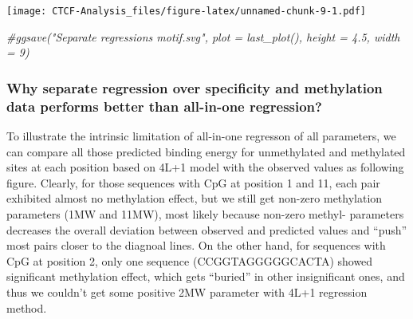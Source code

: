 \documentclass[
]{article}
\newenvironment{Shaded}{\begin{snugshade}}{\end{snugshade}}
\newcommand{\CommentTok}[1]{\textcolor[rgb]{0.56,0.35,0.01}{\textit{#1}}}
\begin{document}
\texttt{[image: CTCF-Analysis\_files/figure-latex/unnamed-chunk-9-1.pdf]}

\begin{Shaded}
\begin{Highlighting}[]
\CommentTok{\#ggsave("Separate regressions motif.svg", plot = last\_plot(), height = 4.5, width = 9)}
\end{Highlighting}
\end{Shaded}

\hypertarget{why-separate-regression-over-specificity-and-methylation-data-performs-better-than-all-in-one-regression}{%
\subsubsection{Why separate regression over specificity and methylation
data performs better than all-in-one
regression?}\label{why-separate-regression-over-specificity-and-methylation-data-performs-better-than-all-in-one-regression}}

To illustrate the intrinsic limitation of all-in-one regresson of all
parameters, we can compare all those predicted binding energy for
unmethylated and methylated sites at each position based on 4L+1 model
with the observed values as following figure. Clearly, for those
sequences with CpG at position 1 and 11, each pair exhibited almost no
methylation effect, but we still get non-zero methylation parameters
(1MW and 11MW), most likely because non-zero methyl- parameters
decreases the overall deviation between observed and predicted values
and ``push'' most pairs closer to the diagnoal lines. On the other hand,
for sequences with CpG at position 2, only one sequence
(CCGGTAGGGGGCACTA) showed significant methylation effect, which gets
``buried'' in other insignificant ones, and thus we couldn't get some
positive 2MW parameter with 4L+1 regression method.
\end{document}
